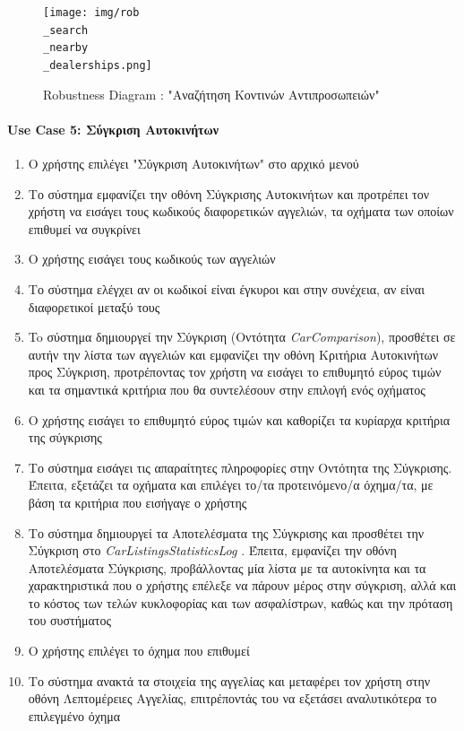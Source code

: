 \documentclass{../ol-softwaremanual}
\begin{document}
	\begin{figure}[htbp!]
		\texttt{[image: img/rob\\\_search\\\_nearby\\\_dealerships.png]}
		\caption{\en Robustness Diagram : "\gr Αναζήτηση Κοντινών Αντιπροσωπειών\en"\gr}
	\end{figure}
	
	\newpage
	
	\centering
	
	\paragraph{\en Use Case 5: \gr Σύγκριση Αυτοκινήτων}
	\begin{enumerate}
		\item Ο χρήστης επιλέγει \en"\gr Σύγκριση Αυτοκινήτων\en" \gr στο αρχικό μενού
		\item Το σύστημα εμφανίζει την οθόνη Σύγκρισης Αυτοκινήτων και προτρέπει τον χρήστη να εισάγει τους κωδικούς διαφορετικών αγγελιών, τα οχήματα των οποίων επιθυμεί να συγκρίνει
		\item Ο χρήστης εισάγει τους κωδικούς των αγγελιών
		\item Το σύστημα ελέγχει αν οι κωδικοί είναι έγκυροι και στην συνέχεια, αν είναι διαφορετικοί μεταξύ τους
		\item To σύστημα δημιουργεί την Σύγκριση (Οντότητα \en \textit{CarComparison}\gr), προσθέτει σε αυτήν την λίστα των αγγελιών και εμφανίζει την οθόνη Κριτήρια Αυτοκινήτων προς Σύγκριση, προτρέποντας τον χρήστη να εισάγει το επιθυμητό εύρος τιμών και τα σημαντικά κριτήρια που θα συντελέσουν στην επιλογή ενός οχήματος
		\item Ο χρήστης εισάγει το επιθυμητό εύρος τιμών και καθορίζει τα κυρίαρχα κριτήρια της σύγκρισης
		\item Το σύστημα εισάγει τις απαραίτητες πληροφορίες στην Οντότητα της Σύγκρισης. Έπειτα, εξετάζει τα οχήματα και επιλέγει το/τα προτεινόμενο/α όχημα/τα, με βάση τα κριτήρια που εισήγαγε ο χρήστης
		\item Το σύστημα δημιουργεί τα Αποτελέσματα της Σύγκρισης και προσθέτει την Σύγκριση στο \en \textit{CarListingsStatisticsLog} \gr. Έπειτα, εμφανίζει την οθόνη Αποτελέσματα Σύγκρισης, προβάλλοντας μία λίστα με τα αυτοκίνητα και τα χαρακτηριστικά που ο χρήστης επέλεξε να πάρουν μέρος στην σύγκριση, αλλά και το κόστος των τελών κυκλοφορίας και των ασφαλίστρων, καθώς και την πρόταση του συστήματος 
		\item Ο χρήστης επιλέγει το όχημα που επιθυμεί
		\item Το σύστημα ανακτά τα στοιχεία της αγγελίας και μεταφέρει τον χρήστη στην οθόνη Λεπτομέρειες Αγγελίας, επιτρέποντάς του να εξετάσει αναλυτικότερα το επιλεγμένο όχημα
	\end{enumerate}
	
\end{document}
